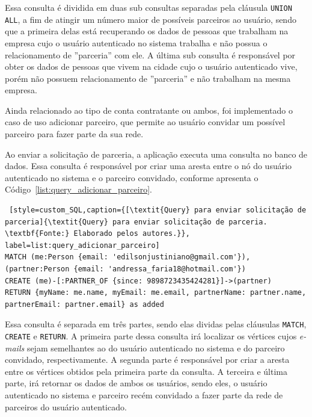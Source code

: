 \par Essa consulta é dividida em duas sub consultas separadas pela cláusula \texttt{UNION ALL}, a fim de atingir um número maior de possíveis parceiros ao usuário, sendo que a primeira delas está recuperando os dados de pessoas que trabalham na empresa cujo o usuário autenticado no sistema trabalha e não possua o relacionamento de ''parceria'' com ele. A última sub consulta é responsável por obter os dados de pessoas que vivem na cidade cujo o usuário autenticado vive, porém não possuem relacionamento de ''parceria'' e não trabalham na mesma empresa.



\par Ainda relacionado ao tipo de conta contratante ou ambos, foi implementado o caso de uso adicionar parceiro, que permite ao usuário convidar um possível parceiro para fazer parte da sua rede.

\par Ao enviar a solicitação de parceria, a aplicação executa uma consulta no banco de dados. Essa consulta é responsável por criar uma aresta entre o nó do usuário autenticado no sistema e o parceiro convidado, conforme apresenta o Código~\ref{list:query_adicionar_parceiro}.

\begin{lstlisting} [style=custom_SQL,caption={[\textit{Query} para enviar solicitação de parceria]{\textit{Query} para enviar solicitação de parceria. \textbf{Fonte:} Elaborado pelos autores.}}, label=list:query_adicionar_parceiro] 	
MATCH (me:Person {email: 'edilsonjustiniano@gmail.com'}),
(partner:Person {email: 'andressa_faria18@hotmail.com'})
CREATE (me)-[:PARTNER_OF {since: 9898723435424281}]->(partner)
RETURN {myName: me.name, myEmail: me.email, partnerName: partner.name, 
partnerEmail: partner.email} as added
\end{lstlisting}

\par Essa consulta é separada em três partes, sendo elas dividas pelas cláusulas \texttt{MATCH}, \texttt{CREATE} e \texttt{RETURN}. A primeira parte dessa consulta irá localizar os vértices cujos \textit{e-mails} sejam semelhantes ao do usuário autenticado no sistema e do parceiro convidado, respectivamente. A segunda parte é responsável por criar a aresta entre os vértices obtidos pela primeira parte da consulta. A terceira e última parte, irá retornar os dados de ambos os usuários, sendo eles, o usuário autenticado no sistema e parceiro recém convidado a fazer parte da rede de parceiros do usuário autenticado.

